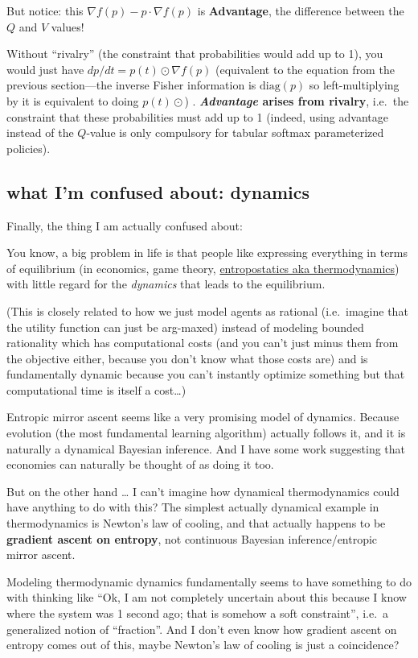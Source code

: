 But notice: this \(\nabla f(p)-p\cdot \nabla f(p)\) is \textbf{Advantage}, the difference between the \(Q\) and \(V\) values!

Without ``rivalry'' (the constraint that probabilities would add up to 1), you would just have \(dp/dt= p(t)\odot \nabla f(p)\) (equivalent to the equation from the previous section---the inverse Fisher information is \(\mathrm{diag}(p)\) so left-multiplying by it is equivalent to doing \(p(t)\odot\)) . \textbf{\emph{Advantage} arises from rivalry}, i.e.~the constraint that these probabilities must add up to 1 (indeed, using advantage instead of the \(Q\)-value is only compulsory for tabular softmax parameterized policies).

\hypertarget{what-im-confused-about-dynamics}{%
\subsection{what I'm confused about: dynamics}\label{what-im-confused-about-dynamics}}

Finally, the thing I am actually confused about:

You know, a big problem in life is that people like expressing everything in terms of equilibrium (in economics, game theory, \href{https://yuxi.ml/essays/equilibrium-thermoeconomics}{entropostatics aka thermodynamics}) with little regard for the \emph{dynamics} that leads to the equilibrium.

(This is closely related to how we just model agents as rational (i.e.~imagine that the utility function can just be arg-maxed) instead of modeling bounded rationality which has computational costs (and you can't just minus them from the objective either, because you don't know what those costs are) and is fundamentally dynamic because you can't instantly optimize something but that computational time is itself a cost\ldots)

Entropic mirror ascent seems like a very promising model of dynamics. Because evolution (the most fundamental learning algorithm) actually follows it, and it is naturally a dynamical Bayesian inference. And I have some work suggesting that economies can naturally be thought of as doing it too.

But on the other hand \ldots{} I can't imagine how dynamical thermodynamics could have anything to do with this? The simplest actually dynamical example in thermodynamics is Newton's law of cooling, and that actually happens to be \textbf{gradient ascent on entropy}, not continuous Bayesian inference/entropic mirror ascent.

Modeling thermodynamic dynamics fundamentally seems to have something to do with thinking like ``Ok, I am not completely uncertain about this because I know where the system was 1 second ago; that is somehow a soft constraint'', i.e.~a generalized notion of ``fraction''. And I don't even know how gradient ascent on entropy comes out of this, maybe Newton's law of cooling is just a coincidence?
